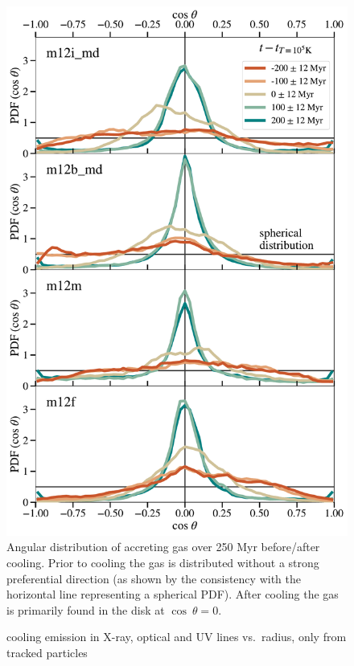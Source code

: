 \documentclass[fleqn,usenatbib]{mnras}
\begin{document}
\begin{figure}
    \centering
    \includegraphics[width=\columnwidth]{figures/theta_vs_t.pdf}
    \caption{
    Angular distribution of accreting gas over 250 Myr before/after cooling.
    Prior to cooling the gas is distributed without a strong preferential direction (as shown by the consistency with the horizontal line representing a spherical PDF).
    After cooling the gas is primarily found in the disk at $\cos\ \theta = 0$.
    }
    \label{f: theta vs R}
\end{figure}



\begin{figure}
    \centering
    \caption{cooling emission in X-ray, optical and UV lines vs.\ radius, only from tracked particles}
    \label{f:emission}
\end{figure}
\end{document}
